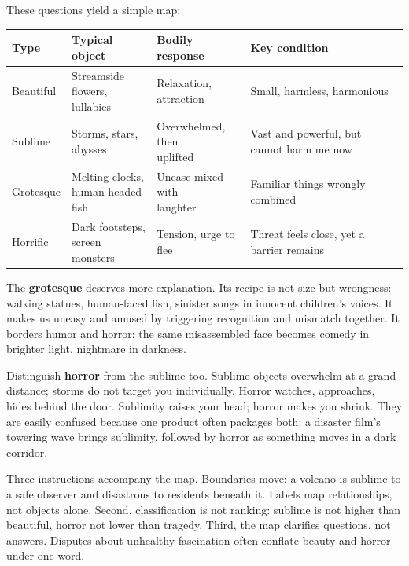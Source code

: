 These questions yield a simple map:

\noindent
\begin{tabularx}{\linewidth}{lllX}
\toprule
Type & Typical object & Bodily response & Key condition \\
\midrule
Beautiful & \shortstack[l]{Streamside\\ flowers, lullabies} & \shortstack[l]{Relaxation,\\ attraction} & Small, harmless, harmonious \\
Sublime & \shortstack[l]{Storms, stars,\\ abysses} & \shortstack[l]{Overwhelmed, then\\ uplifted} & Vast and powerful, but cannot harm me now \\
Grotesque & \shortstack[l]{Melting clocks,\\ human-headed fish} & \shortstack[l]{Unease mixed with\\ laughter} & Familiar things wrongly combined \\
Horrific & \shortstack[l]{Dark footsteps,\\ screen monsters} & \shortstack[l]{Tension, urge to\\ flee} & Threat feels close, yet a barrier remains \\
\bottomrule
\end{tabularx}

\smallskip
The \textbf{grotesque} deserves more explanation. Its recipe is not size but wrongness: walking statues, human-faced fish, sinister songs in innocent children's voices. It makes us uneasy and amused by triggering recognition and mismatch together. It borders humor and horror: the same misassembled face becomes comedy in brighter light, nightmare in darkness.

Distinguish \textbf{horror} from the sublime too. Sublime objects overwhelm at a grand distance; storms do not target you individually. Horror watches, approaches, hides behind the door. Sublimity raises your head; horror makes you shrink. They are easily confused because one product often packages both: a disaster film's towering wave brings sublimity, followed by horror as something moves in a dark corridor.

Three instructions accompany the map. Boundaries move: a volcano is sublime to a safe observer and disastrous to residents beneath it. Labels map relationships, not objects alone. Second, classification is not ranking: sublime is not higher than beautiful, horror not lower than tragedy. Third, the map clarifies questions, not answers. Disputes about unhealthy fascination often conflate beauty and horror under one word.

